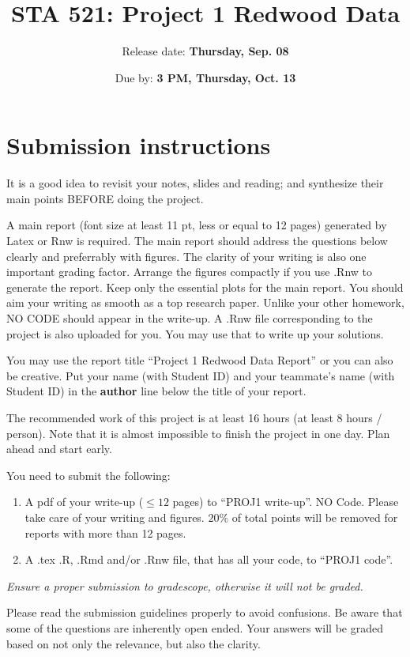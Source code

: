 \documentclass[11pt]{article}
\title{STA 521: Project 1 Redwood Data}
\author{Release date: \textbf{Thursday, Sep. 08}}
\date{Due by: \textbf{3 PM, Thursday, Oct. 13}}
\begin{document}


\maketitle

\section*{Submission instructions}
It is a good idea to revisit your notes, slides and reading;
and synthesize their main points BEFORE doing the
project.

A main report (font size at least 11 pt, less or equal to 12 pages) generated by Latex or Rnw is required. 
The main report should address the questions below clearly and preferrably with figures. The clarity of your writing is also one important grading factor.  
Arrange the figures compactly if you use .Rnw to generate the report. Keep only the essential plots for the main report. You should aim your writing as smooth as a top research paper. Unlike your other homework, NO CODE should appear in the write-up. 
A .Rnw file corresponding to the project is also uploaded for you. You may use that to write up your solutions.

You may use the report title ``Project 1 Redwood Data Report'' or you can also be creative.
Put your name (with Student ID) and your teammate's name (with Student ID) in the \textbf{author} line below the title of your report.

The recommended work of this project is at least 16 hours (at least 8 hours / person). Note that it is almost impossible to finish the project in one day. Plan ahead and start early. 
\newline


You need to submit the following:
\begin{enumerate}
\item A pdf of your write-up ($\leq 12$ pages) to ``PROJ1 write-up''. NO Code. Please take care of your writing and figures. $20\%$ of total points will be removed for reports with more than 12 pages.
\item A .tex .R, .Rmd and/or .Rnw file, that has all your code, to ``PROJ1 code''.
\end{enumerate}
\emph{Ensure a proper submission to gradescope, otherwise it will not be graded. }

\newpage

Please read the submission guidelines properly to avoid confusions. Be aware that some of the questions are inherently open ended. Your answers will be graded based on not only the relevance, but also the clarity.
\end{document}
